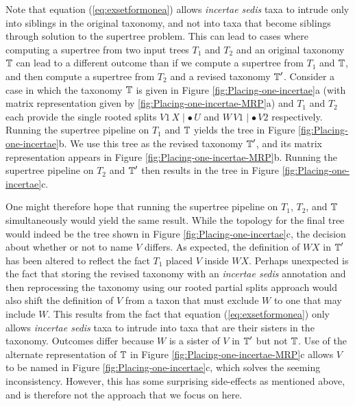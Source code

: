 \documentclass[english]{article}
\begin{document}
Note that equation (\ref{eq:exsetformonea}) allows \emph{incertae sedis}
taxa to intrude only into siblings in the original taxonomy, and not
into taxa that become siblings through solution to the supertree
problem. This can lead to cases where computing a supertree from two
input trees $T_1$ and $T_2$ and an original taxonomy $\mbox{\ensuremath{\mathbb{T}}}$ can
lead to a different outcome than if we compute a supertree from $T_1$
and $\mbox{\ensuremath{\mathbb{T}}}$, and then compute a supertree from $T_2$ and a revised
taxonomy $\mbox{\ensuremath{\mathbb{T}}}^\prime$. Consider a case in which the taxonomy
$\mbox{\ensuremath{\mathbb{T}}}$ is given in Figure \ref{fig:Placing-one-incertae}a (with
matrix representation given by \ref{fig:Placing-one-incertae-MRP}a)
and $T_1$ and $T_2$ each provide the single rooted splits $V1\,X \mid \bullet\,U$ and $W\, V1 \mid
\bullet\,V2$ respectively. 
Running the supertree pipeline on $T_1$  and $\mbox{\ensuremath{\mathbb{T}}}$ yields the tree in
Figure \ref{fig:Placing-one-incertae}b.  We use this tree as the revised
taxonomy $\mbox{\ensuremath{\mathbb{T}}}^\prime$, and its matrix representation appears in
Figure \ref{fig:Placing-one-incertae-MRP}b.  Running the supertree
pipeline on $T_2$  and $\mbox{\ensuremath{\mathbb{T}}}^\prime$ then
results in the tree in Figure \ref{fig:Placing-one-incertae}c.

One might therefore hope that running the supertree pipeline on $T_1$,
$T_2$, and $\mbox{\ensuremath{\mathbb{T}}}$ simultaneously would yield the same result.
While the topology for the final tree would indeed be the tree shown in 
    Figure \ref{fig:Placing-one-incertae}c, the decision about whether
    or not to name $V$ differs.  As expected,  the definition of $WX$
    in $\mbox{\ensuremath{\mathbb{T}}}^\prime$ has been altered to reflect the fact $T_1$
    placed $V$ inside $WX$.  Perhaps unexpected is the fact that
    storing the revised taxonomy with an \emph{incertae sedis}
    annotation and then reprocessing the taxonomy using our rooted
    partial splits approach would also shift the definition of $V$
    from a taxon that must exclude $W$ to one that may include $W$. 
    This results from the fact that equation (\ref{eq:exsetformonea})
    only allows \emph{incertae sedis} taxa to intrude into taxa that
    are their
    sisters in the taxonomy.  Outcomes differ because $W$ is a sister of $V$ in
    $\mbox{\ensuremath{\mathbb{T}}}^\prime$ but not $\mbox{\ensuremath{\mathbb{T}}}$.  Use of the alternate
    representation of $\mbox{\ensuremath{\mathbb{T}}}$ in Figure \ref{fig:Placing-one-incertae-MRP}c
    allows $V$ to be named in Figure \ref{fig:Placing-one-incertae}c,
    which solves the seeming inconsistency.  However, this has some
    surprising side-effects as mentioned above, and is therefore not
    the approach that we focus on here.
\end{document}
